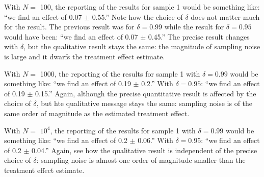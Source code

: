 \documentclass[]{book}
\newenvironment{Shaded}{\begin{snugshade}}{\end{snugshade}}
\newcommand{\ControlFlowTok}[1]{\textcolor[rgb]{0.13,0.29,0.53}{\textbf{#1}}}
\newcommand{\DataTypeTok}[1]{\textcolor[rgb]{0.13,0.29,0.53}{#1}}
\newcommand{\DecValTok}[1]{\textcolor[rgb]{0.00,0.00,0.81}{#1}}
\newcommand{\FloatTok}[1]{\textcolor[rgb]{0.00,0.00,0.81}{#1}}
\newcommand{\KeywordTok}[1]{\textcolor[rgb]{0.13,0.29,0.53}{\textbf{#1}}}
\newcommand{\NormalTok}[1]{#1}
\newcommand{\OperatorTok}[1]{\textcolor[rgb]{0.81,0.36,0.00}{\textbf{#1}}}
\newcommand{\StringTok}[1]{\textcolor[rgb]{0.31,0.60,0.02}{#1}}
\theoremstyle{definition}
\theoremstyle{definition}
\theoremstyle{definition}
\theoremstyle{remark}
\begin{document}
\begin{Shaded}
\end{Shaded}

With \(N=\) 100, the reporting of the results for sample 1 would be something like: ``we find an effect of 0.07 \(\pm\) 0.55.''
Note how the choice of \(\delta\) does not matter much for the result.
The previous result was for \(\delta=0.99\) while the result for \(\delta=0.95\) would have been: ``we find an effect of 0.07 \(\pm\) 0.45.''
The precise result changes with \(\delta\), but the qualitative result stays the same: the magnitude of sampling noise is large and it dwarfs the treatment effect estimate.

With \(N=\) 1000, the reporting of the results for sample 1 with \(\delta=0.99\) would be something like: ``we find an effect of 0.19 \(\pm\) 0.2.''
With \(\delta=0.95\): ``we find an effect of 0.19 \(\pm\) 0.15.''
Again, although the precise quantitative result is affected by the choice of \(\delta\), but hte qualitative message stays the same: sampling noise is of the same order of magnitude as the estimated treatment effect.

With \(N=\) \ensuremath{10^{4}}, the reporting of the results for sample 1 with \(\delta=0.99\) would be something like: ``we find an effect of 0.2 \(\pm\) 0.06.''
With \(\delta=0.95\): ``we find an effect of 0.2 \(\pm\) 0.04.''
Again, see how the qualitative result is independent of the precise choice of \(\delta\): sampling noise is almost one order of magnitude smaller than the treatment effect estimate.
\end{document}
